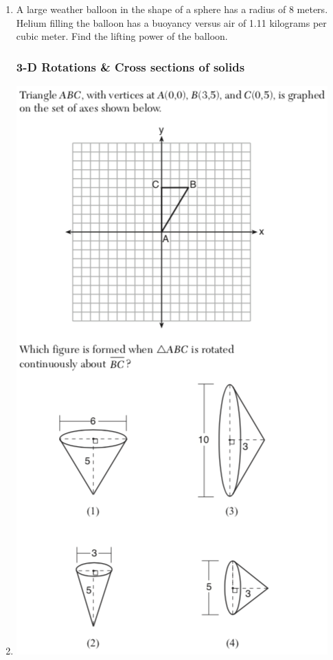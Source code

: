 \documentclass[12pt, twoside]{article}
\begin{document}
\begin{enumerate}
\item A large weather balloon in the shape of a sphere has a radius of 8 meters. Helium filling the balloon has a buoyancy versus air of 1.11 kilograms per cubic meter. Find the lifting power of the balloon.  \vspace{3cm}

\newpage
\subsubsection*{3-D Rotations \& Cross sections of solids}
\item %
    \includegraphics[scale=0.75]{triangle_3d_rotation_JN2018.png}


\end{enumerate}
\end{document}
